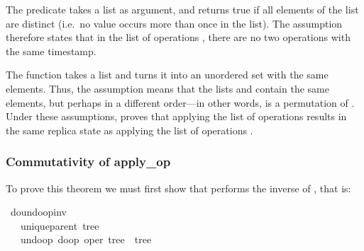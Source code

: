 \documentclass[sigconf]{acmart}
\renewenvironment{isabelle}{%
  \medbreak\noindent%
  \renewcommand{\isanewline}{\\}%
  \begin{minipage}{\columnwidth}%
  \begin{isabellebody}%
  \begin{tabbing}%
}{%
  \end{tabbing}%
  \end{isabellebody}%
  \end{minipage}%
  \medbreak%
}
\renewcommand{\isacartoucheopen}{}
\renewcommand{\isacartoucheclose}{}
\begin{document}
The predicate  takes a list as argument, and returns true if all elements of the list are distinct (i.e.\ no value occurs more than once in the list).
The assumption  therefore states that in the list of operations , there are no two operations with the same timestamp.

The function  takes a list and turns it into an unordered set with the same elements.
Thus, the assumption  means that the lists  and  contain the same elements, but perhaps in a different order---in other words,  is a permutation of .
Under these assumptions,  proves that applying the list of operations  results in the same replica state as applying the list of operations .

\subsubsection{Commutativity of apply\_op}

To prove this theorem we must first show that  performs the inverse of , that is:
\begin{isabelle}
\isamarkupfalse%
\ do{\isacharunderscore}undo{\isacharunderscore}op{\isacharunderscore}inv{\isacharcolon}\isanewline
\ \ \ {\isacartoucheopen}unique{\isacharunderscore}parent\ tree{\isacartoucheclose}\isanewline
\ \ \ {\isacartoucheopen}undo{\isacharunderscore}op\ {\isacharparenleft}do{\isacharunderscore}op\ {\isacharparenleft}oper{\isacharcomma}\ tree{\isacharparenright}{\isacharparenright}\ {\isacharequal}\ tree{\isacartoucheclose}
\end{isabelle}
\end{document}
